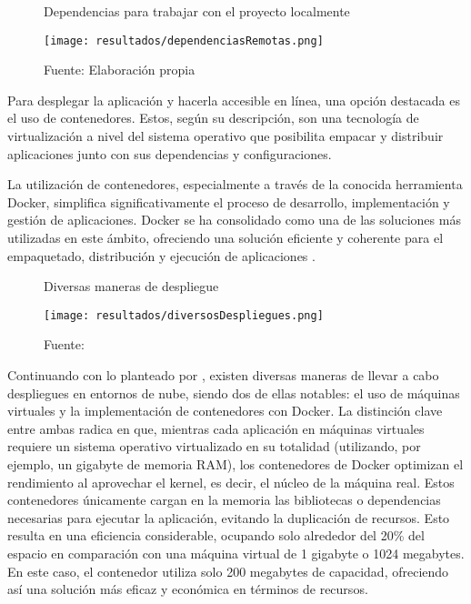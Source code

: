 \newpage

\begin{figure}[h]
	\centering
	\caption{Dependencias para trabajar con el proyecto localmente}
	\texttt{[image: resultados/dependenciasRemotas.png]}
	\caption*{\footnotesize Fuente: Elaboración propia}
	\label{fig:figuraDependenciasRemotas}
\end{figure}

Para desplegar la aplicación y hacerla accesible en línea, una opción destacada es el uso de contenedores. Estos, según su descripción, son una tecnología de virtualización a nivel del sistema operativo que posibilita empacar y distribuir aplicaciones junto con sus dependencias y configuraciones.

\newpage

La utilización de contenedores, especialmente a través de la conocida herramienta Docker, simplifica significativamente el proceso de desarrollo, implementación y gestión de aplicaciones. Docker se ha consolidado como una de las soluciones más utilizadas en este ámbito, ofreciendo una solución eficiente y coherente para el empaquetado, distribución y ejecución de aplicaciones \citep{orovengua2016}.


\begin{figure}[h]
	\centering
	\caption{Diversas maneras de despliegue}
	\texttt{[image: resultados/diversosDespliegues.png]}
	\caption*{\footnotesize Fuente: \cite{orovengua2016}}
	\label{fig:figuraDiversosDespliegues}
\end{figure}

Continuando con lo planteado por \cite{orovengua2016}, existen diversas maneras de llevar a cabo despliegues en entornos de nube, siendo dos de ellas notables: el uso de máquinas virtuales y la implementación de contenedores con Docker. La distinción clave entre ambas radica en que, mientras cada aplicación en máquinas virtuales requiere un sistema operativo virtualizado en su totalidad (utilizando, por ejemplo, un gigabyte de memoria RAM), los contenedores de Docker optimizan el rendimiento al aprovechar el kernel, es decir, el núcleo de la máquina real. Estos contenedores únicamente cargan en la memoria las bibliotecas o dependencias necesarias para ejecutar la aplicación, evitando la duplicación de recursos. Esto resulta en una eficiencia considerable, ocupando solo alrededor del 20\% del espacio en comparación con una máquina virtual de 1 gigabyte o 1024 megabytes. En este caso, el contenedor utiliza solo 200 megabytes de capacidad, ofreciendo así una solución más eficaz y económica en términos de recursos. \newline

